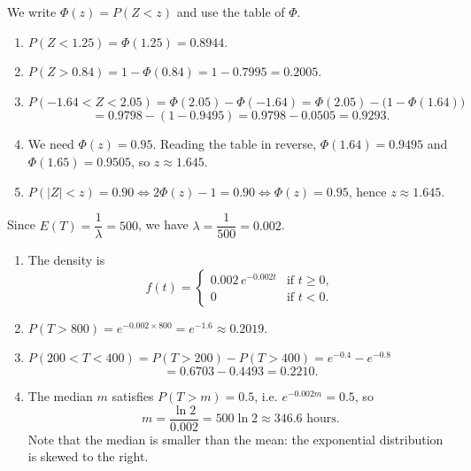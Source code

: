 \documentclass[11pt]{article}
\begin{document}
\begin{corrige}
We write $\Phi(z) = P(Z < z)$ and use the table of $\Phi$.

\begin{enumerate}
\item $P(Z < 1.25) = \Phi(1.25) = \boxed{0.8944}$.

\item $P(Z > 0.84) = 1 - \Phi(0.84) = 1 - 0.7995 = \boxed{0.2005}$.

\item $P(-1.64 < Z < 2.05) = \Phi(2.05) - \Phi(-1.64) = \Phi(2.05) - \bigl(1 - \Phi(1.64)\bigr)$
\[
= 0.9798 - (1 - 0.9495) = 0.9798 - 0.0505 = \boxed{0.9293}.
\]

\item We need $\Phi(z) = 0.95$. Reading the table in reverse, $\Phi(1.64) = 0.9495$ and $\Phi(1.65) = 0.9505$, so $\boxed{z \approx 1.645}$.

\item $P(|Z| < z) = 0.90 \iff 2\Phi(z) - 1 = 0.90 \iff \Phi(z) = 0.95$, hence $\boxed{z \approx 1.645}$.
\end{enumerate}
\end{corrige}

\begin{corrige}
Since $E(T) = \dfrac{1}{\lambda} = 500$, we have $\lambda = \dfrac{1}{500} = 0.002$.

\begin{enumerate}
\item The density is
\[
f(t) = \begin{cases} 0.002\, e^{-0.002 t} & \text{if } t \ge 0, \\ 0 & \text{if } t < 0. \end{cases}
\]

\item $P(T > 800) = e^{-0.002 \times 800} = e^{-1.6} \approx \boxed{0.2019}$.

\item $P(200 < T < 400) = P(T>200) - P(T>400) = e^{-0.4} - e^{-0.8}$
\[
= 0.6703 - 0.4493 = \boxed{0.2210}.
\]

\item The median $m$ satisfies $P(T > m) = 0.5$, i.e. $e^{-0.002 m} = 0.5$, so
\[
m = \frac{\ln 2}{0.002} = 500 \ln 2 \approx \boxed{346.6 \text{ hours}}.
\]
Note that the median is smaller than the mean: the exponential distribution is skewed to the right.
\end{enumerate}
\end{corrige}
\end{document}
